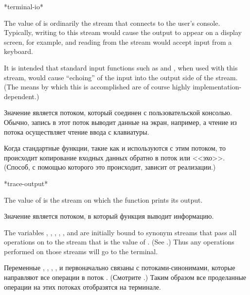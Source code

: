 \begin{defun}[Variable]
*terminal-io*

The value of  is ordinarily
the stream that connects to the user's console.
Typically, writing to this stream would cause the output to appear
on a display screen, for example, and reading from the stream would
accept input from a keyboard.

It is intended
that standard input functions such as  and ,
when used with this stream, would cause ``echoing'' of the input
into the output side of the stream.  (The means by which this is
accomplished are of course highly implementation-dependent.)

Значение  является потоком, который соединен с
пользовательской консолью. Обычно, запись в этот поток выводит данные на экран,
например, а чтение из потока осуществляет чтение ввода с клавиатуры.

Когда стандартные функции, такие как  и  используются с
этим потоком, то происходит копирование входных данных обратно в поток
или <<эхо>>. (Способ, с помощью которого это происходит, зависит от реализации.)
\end{defun}

\begin{defun}[Variable]
*trace-output*

The value of  is the stream on which the 
function prints its output.

Значение  является потоком, в который функция 
выводит информацию.
\end{defun}

The variables
, ,
,
,
, and 
are initially bound to synonym streams that pass all
operations on to the stream that is the value of .
(See .)
Thus any operations performed on those streams will go to the terminal.

Переменные , ,
,
,
 и 
первоначально связаны с потоками-синонимами, которые направляют все операции в
поток .
(Смотрите .)
Таким образом все проделанные операции на этих потоках отобразятся на терминале.

